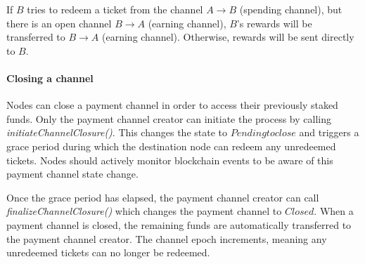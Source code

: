 If $B$ tries to redeem a ticket from the channel $A\rightarrow B$ (spending channel), but there is an open channel $B\rightarrow A$ (earning channel), $B$'s rewards will be transferred to $B\rightarrow A$ (earning channel). Otherwise, rewards will be sent directly to $B$.

\paragraph{Closing a channel}
Nodes can close a payment channel in order to access their previously staked funds. Only the payment channel creator can initiate the process by calling \textit{initiateChannelClosure()}. This changes the state to $Pending to close$ and triggers a grace period during which the destination node can redeem any unredeemed tickets. Nodes should actively monitor blockchain events to be aware of this payment channel state change.

Once the grace period has elapsed, the payment channel creator can call \textit{finalizeChannelClosure()} which changes the payment channel to $Closed$. When a payment channel is closed, the remaining funds are automatically transferred to the payment channel creator. The channel epoch increments, meaning any unredeemed tickets can no longer be redeemed.

